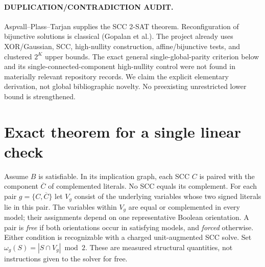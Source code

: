\documentclass[11pt]{article}
\begin{document}
\paragraph{DUPLICATION/CONTRADICTION AUDIT.}
Aspvall--Plass--Tarjan supplies the SCC 2-SAT theorem. Reconfiguration of bijunctive solutions is classical (Gopalan et al.). The project already uses XOR/Gaussian, SCC, high-nullity construction, affine/bijunctive tests, and clustered $2^K$ upper bounds. The exact general single-global-parity criterion below and its single-connected-component high-nullity control were not found in materially relevant repository records. We claim the explicit elementary derivation, not global bibliographic novelty. No preexisting unrestricted lower bound is strengthened.

\section{Exact theorem for a single linear check}
Assume $B$ is satisfiable. In its implication graph, each SCC $C$ is paired with the component $\overline C$ of complemented literals. No SCC equals its complement. For each pair $g=\{C,\overline C\}$ let $V_g$ consist of the underlying variables whose two signed literals lie in this pair. The variables within $V_g$ are equal or complemented in every model; their assignments depend on one representative Boolean orientation. A pair is \emph{free} if both orientations occur in satisfying models, and \emph{forced} otherwise. Either condition is recognizable with a charged unit-augmented SCC solve. Set $\omega_g(S)=|S\cap V_g|\bmod2$. These are measured structural quantities, not instructions given to the solver for free.
\end{document}
